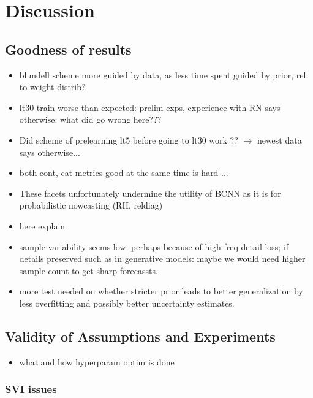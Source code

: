 \chapter{Discussion}
\label{chapter:discussion}

\section{Goodness of results}

\begin{itemize}
	\item blundell scheme more guided by data, as less time spent guided by prior, rel. to weight distrib?
	\item lt30 train worse than expected: prelim exps, experience with RN says otherwise: what did go wrong here???
	\item Did scheme of prelearning lt5 before going to lt30 work ?? $\to$ newest data says otherwise...
	\item both cont, cat metrics good at the same time is hard ...
	\item These facets unfortunately undermine the utility of BCNN as it is for probabilistic nowcasting (RH, reldiag)
	\item here explain 
	\item sample variability seems low: perhaps because of high-freq detail loss; if details preserved such as in generative models: maybe we would need higher sample count to get sharp forecassts.
	\item more test needed on whether stricter prior leads to better generalization by less overfitting and possibly better uncertainty estimates.
\end{itemize}



\section{Validity of Assumptions and Experiments}

\begin{itemize}
		\item what and how hyperparam optim is done
\end{itemize}

\subsection*{SVI issues}

